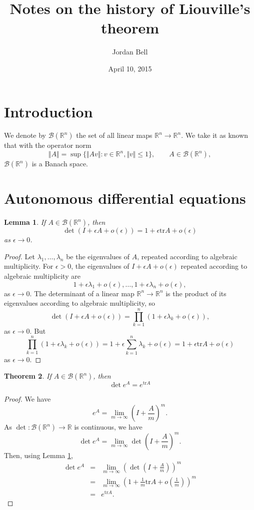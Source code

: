 \documentclass{article}
\newcommand{\tr}{\textrm{tr}}
\newcommand{\norm}[1]{\Vert #1 \Vert}
\newtheorem{theorem}{Theorem}
\newtheorem{lemma}[theorem]{Lemma}
\begin{document}
\title{Notes on the history of Liouville's theorem}
\author{Jordan Bell}
\date{April 10, 2015}

\maketitle

\section{Introduction}
We denote by $\mathscr{B}(\mathbb{R}^n)$ the set of all linear maps $\mathbb{R}^n \to \mathbb{R}^n$. We take it as known
that with the operator norm
\[
\norm{A} = \sup \{\norm{Av}: v\in \mathbb{R}^n, \norm{v} \leq 1\}, \qquad A \in \mathscr{B}(\mathbb{R}^n),
\]
$\mathscr{B}(\mathbb{R}^n)$ is a Banach space.


\section{Autonomous differential equations}
\begin{lemma}
If $A \in \mathscr{B}(\mathbb{R}^n)$, then 
\[
 \det (I+\epsilon A+o(\epsilon))=1+\epsilon \tr A +o(\epsilon)
\]
as $\epsilon \to 0$.
\label{detlemma}
\end{lemma}
\begin{proof}
Let $\lambda_1,\ldots,\lambda_n$ be the eigenvalues of $A$, repeated according
to algebraic multiplicity. For $\epsilon>0$, the eigenvalues of $I+\epsilon A+o(\epsilon)$  repeated according to algebraic multiplicity are
\[
1+\epsilon \lambda_1+o(\epsilon),\ldots,
1+\epsilon \lambda_n+o(\epsilon),
\]
as $\epsilon \to 0$. The determinant of a linear map $\mathbb{R}^n \to \mathbb{R}^n$ is the product of its eigenvalues according to algebraic
 multiplicity, so
 \[
 \det (I+\epsilon A+o(\epsilon)) = \prod_{k=1}^n (1+\epsilon \lambda_k+o(\epsilon)),
 \]
 as $\epsilon \to 0$.
 But
 \[
 \prod_{k=1}^n (1+\epsilon \lambda_k + o(\epsilon)) = 1 + \epsilon \sum_{k=1}^n \lambda_k +o(\epsilon) = 1+\epsilon \tr A +o(\epsilon)
 \]
 as $\epsilon \to 0$.
 \end{proof}
 
 

\begin{theorem}
If $A \in \mathscr{B}(\mathbb{R}^n)$, then
\[
\det e^A = e^{\tr A}
\]
\label{dettheorem}
\end{theorem}
\begin{proof}
We have
\[
e^A=\lim_{m \to \infty} \left(I+\frac{A}{m}\right)^m.
\]
As $\det:\mathscr{B}(\mathbb{R}^n) \to \mathbb{R}$ is continuous, we have
\[
\det e^A = \lim_{m \to \infty} \det  \left(I+\frac{A}{m}\right)^m.
\]
Then, using Lemma \ref{detlemma},
\begin{eqnarray*}
\det e^A&=&\lim_{m \to \infty} \left(\det  \left(I+\frac{A}{m}\right) \right)^m\\
&=&\lim_{m \to \infty} \left( 1+ \frac{1}{m}\tr A + o\left(\frac{1}{m}\right) \right)^m\\
&=&e^{\tr A}.
\end{eqnarray*}
\end{proof}
\end{document}
